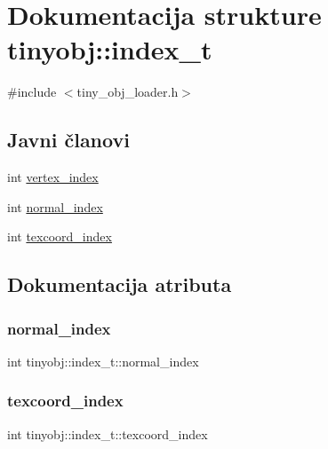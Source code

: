 \hypertarget{structtinyobj_1_1index__t}{}\section{Dokumentacija strukture tinyobj\+:\+:index\+\_\+t}
\label{structtinyobj_1_1index__t}


{\ttfamily \#include $<$tiny\+\_\+obj\+\_\+loader.\+h$>$}

\subsection*{Javni članovi}
\begin{DoxyCompactItemize}
\item 
int \hyperlink{structtinyobj_1_1index__t_a7eeb7de9f1fad091081b2b1d037c4beb}{vertex\+\_\+index}
\item 
int \hyperlink{structtinyobj_1_1index__t_acc544f8c9b23b5093d291dcf787a2d77}{normal\+\_\+index}
\item 
int \hyperlink{structtinyobj_1_1index__t_ac27280f3e6bd7db6eb6f05232db9726d}{texcoord\+\_\+index}
\end{DoxyCompactItemize}


\subsection{Dokumentacija atributa}
\mbox{\label{structtinyobj_1_1index__t_acc544f8c9b23b5093d291dcf787a2d77}} 
\subsubsection{\texorpdfstring{normal\+\_\+index}{normal\_index}}
{\footnotesize\ttfamily int tinyobj\+::index\+\_\+t\+::normal\+\_\+index}

\mbox{\label{structtinyobj_1_1index__t_ac27280f3e6bd7db6eb6f05232db9726d}} 
\subsubsection{\texorpdfstring{texcoord\+\_\+index}{texcoord\_index}}
{\footnotesize\ttfamily int tinyobj\+::index\+\_\+t\+::texcoord\+\_\+index}

